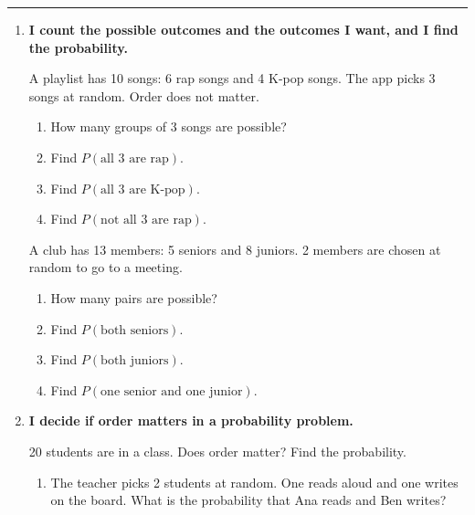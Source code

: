 \documentclass[11pt]{article}
\newcommand{\lessonhead}[1]{\par\vspace{0.6em}{\large\bfseries #1}\par\vspace{0.25em}\hrule\vspace{0.6em}}
\newcommand{\goal}[1]{\textbf{#1}\par\vspace{0.35em}}
\begin{document}
\newpage
\lessonhead{6.7 - Probability with Counting}
\begin{enumerate}[resume]

\item \goal{I count the possible outcomes and the outcomes I want, and I find the probability.}
A playlist has 10 songs: 6 rap songs and 4 K-pop songs. The app picks 3 songs at random. Order does not matter.
\begin{enumerate}
  \item How many groups of 3 songs are possible? 
  \work{3.5em}
  \item Find $P(\text{all 3 are rap})$. 
  \work{4em}
  \item Find $P(\text{all 3 are K-pop})$. 
  \work{4em}
  \item Find $P(\text{not all 3 are rap})$. 
  \work{4em}
\end{enumerate}

\vspace{0.4em}
A club has 13 members: 5 seniors and 8 juniors. 2 members are chosen at random to go to a meeting.
\begin{enumerate}[start=5]
  \item How many pairs are possible? 
  \work{3.5em}
  \item Find $P(\text{both seniors})$. 
  \work{4em}
  \item Find $P(\text{both juniors})$. 
  \work{4em}
  \item Find $P(\text{one senior and one junior})$.

  \work{4em}
\end{enumerate}

\newpage
\item \goal{I decide if order matters in a probability problem.}
20 students are in a class. Does order matter? Find the probability.
\begin{enumerate}
  \item The teacher picks 2 students at random. One reads aloud and one writes on the board. What is the probability that Ana reads and Ben writes?


\end{enumerate}
\end{enumerate}
\end{document}
